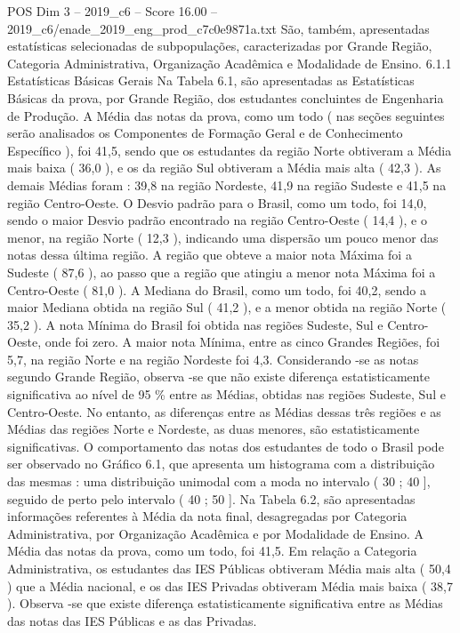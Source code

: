 \begin{textsample}{POS Dim 3 – 2019\_c6 – Score 16.00 – 2019\_c6/enade\_2019\_eng\_prod\_c7c0e9871a.txt}
São, também, apresentadas estatísticas selecionadas de subpopulações, caracterizadas por Grande Região, Categoria Administrativa, Organização Acadêmica e Modalidade de Ensino. 6.1.1 Estatísticas Básicas Gerais Na Tabela 6.1, são apresentadas as Estatísticas Básicas da prova, por Grande Região, dos estudantes concluintes de Engenharia de Produção.
A Média das notas da prova, como um todo ( nas seções seguintes serão analisados os Componentes de Formação Geral e de Conhecimento Específico ), foi 41,5, sendo que os estudantes da região Norte obtiveram a Média mais baixa ( 36,0 ), e os da região Sul obtiveram a Média mais alta ( 42,3 ).
As demais Médias foram : 39,8 na região Nordeste, 41,9 na região Sudeste e 41,5 na região Centro-Oeste.
O Desvio padrão para o Brasil, como um todo, foi 14,0, sendo o maior Desvio padrão encontrado na região Centro-Oeste ( 14,4 ), e o menor, na região Norte ( 12,3 ), indicando uma dispersão um pouco menor das notas dessa última região.
A região que obteve a maior nota Máxima foi a Sudeste ( 87,6 ), ao passo que a região que atingiu a menor nota Máxima foi a Centro-Oeste ( 81,0 ).
A Mediana do Brasil, como um todo, foi 40,2, sendo a maior Mediana obtida na região Sul ( 41,2 ), e a menor obtida na região Norte ( 35,2 ).
A nota Mínima do Brasil foi obtida nas regiões Sudeste, Sul e Centro-Oeste, onde foi zero.
A maior nota Mínima, entre as cinco Grandes Regiões, foi 5,7, na região Norte e na região Nordeste foi 4,3.
Considerando -se as notas segundo Grande Região, observa -se que não existe diferença estatisticamente significativa ao nível de 95 \% entre as Médias, obtidas nas regiões Sudeste, Sul e Centro-Oeste.
No entanto, as diferenças entre as Médias dessas três regiões e as Médias das regiões Norte e Nordeste, as duas menores, são estatisticamente significativas.
O comportamento das notas dos estudantes de todo o Brasil pode ser observado no Gráfico 6.1, que apresenta um histograma com a distribuição das mesmas : uma distribuição unimodal com a moda no intervalo ( 30 ; 40 ], seguido de perto pelo intervalo ( 40 ; 50 ].
Na Tabela 6.2, são apresentadas informações referentes à Média da nota final, desagregadas por Categoria Administrativa, por Organização Acadêmica e por Modalidade de Ensino.
A Média das notas da prova, como um todo, foi 41,5.
Em relação a Categoria Administrativa, os estudantes das IES Públicas obtiveram Média mais alta ( 50,4 ) que a Média nacional, e os das IES Privadas obtiveram Média mais baixa ( 38,7 ).
Observa -se que existe diferença estatisticamente significativa entre as Médias das notas das IES Públicas e as das Privadas.

\end{textsample}
